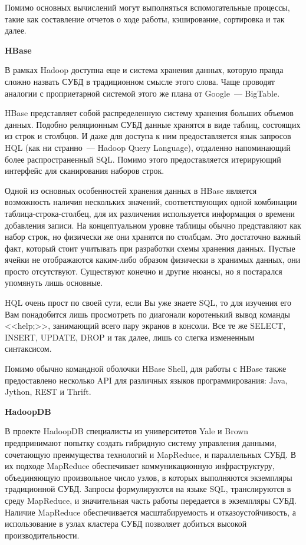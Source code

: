 Помимо основных вычислений могут выполняться вспомогательные процессы, такие как составление отчетов о ходе работы, кэширование, сортировка и так далее.

\textbf{HBase}

В рамках Hadoop доступна еще и система хранения данных, которую правда сложно назвать СУБД в традиционном смысле этого слова. Чаще проводят аналогии с проприетарной системой этого же плана от Google~--- BigTable.

HBase представляет собой распределенную систему хранения больших объемов данных. Подобно реляционным СУБД данные хранятся в виде таблиц, состоящих из строк и столбцов. И даже для доступа к ним предоставляется язык запросов HQL (как ни странно~--- Hadoop Query Language), отдаленно напоминающий более распространенный SQL. Помимо этого предоставляется итерирующий интерфейс для сканирования наборов строк.

Одной из основных особенностей хранения данных в HBase является возможность наличия нескольких значений, соответствующих одной комбинации таблица-строка-столбец, для их различения используется информация о времени добавления записи. На концептуальном уровне таблицы обычно представляют как набор строк, но физически же они хранятся по столбцам. Это достаточно важный факт, который стоит учитывать при разработки схемы хранения данных. Пустые ячейки не отображаются каким-либо образом физически в хранимых данных, они просто отсутствуют. Существуют конечно и другие нюансы, но я постарался упомянуть лишь основные.

HQL очень прост по своей сути, если Вы уже знаете SQL, то для изучения его Вам понадобится лишь просмотреть по диагонали коротенький вывод команды <<help;>>, занимающий всего пару экранов в консоли. Все те же SELECT, INSERT, UPDATE, DROP и так далее, лишь со слегка измененным синтаксисом.

Помимо обычно командной оболочки HBase Shell, для работы с HBase также предоставлено несколько API для различных языков программирования: Java, Jython, REST и Thrift.

\textbf{HadoopDB}

В проекте HadoopDB специалисты из университетов Yale и Brown предпринимают попытку создать гибридную систему управления данными, сочетающую преимущества технологий и MapReduce, и параллельных СУБД. В их подходе MapReduce обеспечивает коммуникационную инфраструктуру, объединяющую произвольное число узлов, в которых выполняются экземпляры традиционной СУБД. Запросы формулируются на языке SQL, транслируются в среду MapReduce, и значительная часть работы передается в экземпляры СУБД. Наличие MapReduce обеспечивается масштабируемость и отказоустойчивость, а использование в узлах кластера СУБД позволяет добиться высокой производительности.


